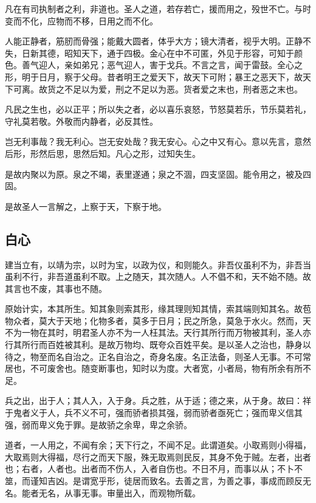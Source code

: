 \documentclass[]{article}
\begin{document}
凡在有司执制者之利，非道也。圣人之道，若存若亡，援而用之，殁世不亡。与时变而不化，应物而不移，日用之而不化。

人能正静者，筋肕而骨强；能戴大圆者，体乎大方；镜大清者，视乎大明。正静不失，日新其德，昭知天下，通于四极。金心在中不可匿，外见于形容，可知于颜色。善气迎人，亲如弟兄；恶气迎人，害于戈兵。不言之言，闻于雷鼓。全心之形，明于日月，察于父母。昔者明王之爱天下，故天下可附；暴王之恶天下，故天下可离。故货之不足以为爱，刑之不足以为恶。货者爱之末也，刑者恶之末也。

凡民之生也，必以正平；所以失之者，必以喜乐哀怒，节怒莫若乐，节乐莫若礼，守礼莫若敬。外敬而内静者，必反其性。

岂无利事哉？我无利心。岂无安处哉？我无安心。心之中又有心。意以先言，意然后形，形然后思，思然后知。凡心之形，过知失生。

是故内聚以为原。泉之不竭，表里遂通；泉之不涸，四支坚固。能令用之，被及四固。

是故圣人一言解之，上察于天，下察于地。

\hypertarget{header-n531}{%
\subsection{白心}\label{header-n531}}

建当立有，以靖为宗，以时为宝，以政为仪，和则能久。非吾仪虽利不为，非吾当虽利不行，非吾道虽利不取。上之随天，其次随人。人不倡不和，天不始不随。故其言也不废，其事也不随。

原始计实，本其所生。知其象则索其形，缘其理则知其情，索其端则知其名。故苞物众者，莫大于天地；化物多者，莫多于日月；民之所急，莫急于水火。然而，天不为一物在其时，明君圣人亦不为一人枉其法。天行其所行而万物被其利，圣人亦行其所行而百姓被其利。是故万物均、既夸众百姓平矣。是以圣人之治也，静身以待之，物至而名自治之。正名自治之，奇身名废。名正法备，则圣人无事。不可常居也，不可废舍也。随变断事也，知时以为度。大者宽，小者局，物有所余有所不足。

兵之出，出于人；其人入，入于身。兵之胜，从于适；德之来，从于身。故曰：祥于鬼者义于人，兵不义不可，强而骄者损其强，弱而骄者亟死亡；强而卑义信其强，弱而卑义免于罪。是故骄之余卑，卑之余骄。

道者，一人用之，不闻有余；天下行之，不闻不足。此谓道矣。小取焉则小得福，大取焉则大得福，尽行之而天下服，殊无取焉则民反，其身不免于贼。左者，出者也；右者，人者也。出者而不伤人，入者自伤也。不日不月，而事以从；不卜不筮，而谨知吉凶。是谓宽乎形，徒居而致名。去善之言，为善之事，事成而顾反无名。能者无名，从事无事。审量出入，而观物所载。
\end{document}
